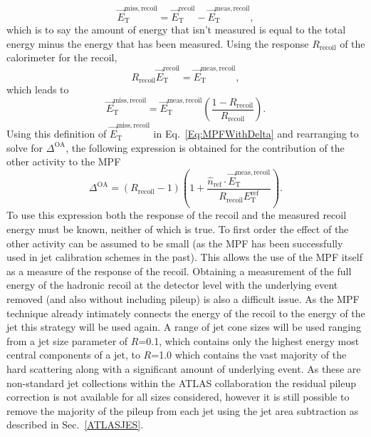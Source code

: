 \begin{equation}
  \vec{E}_{\mathrm T}^{\mathrm{miss, recoil}} = \vec{E}_{\mathrm T}^{\mathrm{recoil}} - \vec{E}_{\mathrm T}^{\mathrm{meas, recoil}}, 
\end{equation}
\noindent 
which is to say the amount of energy that isn't measured is equal to the total energy minus the energy that has been measured.  
Using the response $R_{\mathrm{recoil}}$ of the calorimeter for the recoil, 
\begin{equation}
  R_{\mathrm{recoil}}\vec{E}_{\mathrm T}^{\mathrm{recoil}} = \vec{E}_{\mathrm T}^{\mathrm{meas, recoil}}, 
\end{equation}
\noindent
which leads to 
\begin{equation}
  \vec{E}_{\mathrm T}^{\mathrm{miss, recoil}} = \vec{E}_{\mathrm T}^{\mathrm{meas, recoil}}\left(\frac{1-R_{\mathrm{recoil}}}{R_{\mathrm{recoil}}}\right).  
\end{equation}
\noindent
Using this definition of $\vec{E}_{\mathrm T}^{\mathrm{miss, recoil}}$ in Eq.~\ref{Eq:MPFWithDelta} and rearranging to solve for $\Delta^{\mathrm{OA}}$, the following expression is obtained for the contribution of the other activity to the MPF 
\begin{equation}
  \Delta^{\mathrm{OA}}=\left(R_{\mathrm{recoil}}-1\right)\left(1+\frac{\hat n_{\mathrm{ref}}\cdot \vec{E}_{\mathrm T}^{\mathrm{meas, recoil}}}{R_{\mathrm{recoil}}{E}_{\mathrm T}^{\mathrm{ref}}}\right).  
  \label{Eq:OA}
\end{equation} 
To use this expression both the response of the recoil and the measured recoil energy must be known, neither of which is true.  
To first order the effect of the other activity can be assumed to be small (as the MPF has been successfully used in jet calibration schemes in the past).  
This allows the use of the MPF itself as a measure of the response of the recoil.  
Obtaining a measurement of the full energy of the hadronic recoil at the detector level with the underlying event removed (and also without including pileup) is also a difficult issue.  
As the MPF technique already intimately connects the energy of the recoil to the energy of the jet this strategy will be used again.  
A range of jet cone sizes will be used ranging from a jet size parameter of $R$=0.1, which contains only the highest energy most central components of a jet, to $R$=1.0 which contains the vast majority of the hard scattering along with a significant amount of underlying event.   
As these are non-standard jet collections within the ATLAS collaboration the residual pileup correction is not available for all sizes considered, however it is still possible to remove the majority of the pileup from each jet using the jet area subtraction as described in Sec.~\ref{ATLASJES}.  

